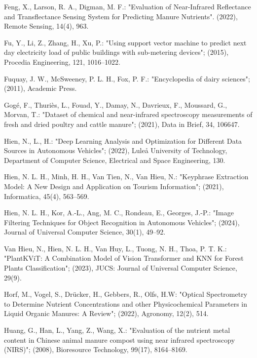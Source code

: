 \documentclass[10pt, a4paper, oneside]{article}
\begin{document}
\begin{thebibliography}{}
{ Feng, X., Larson, R. A., Digman, M. F.: "Evaluation of Near-Infrared Reflectance and Transflectance Sensing System for Predicting Manure Nutrients". (2022), Remote Sensing, 14(4), 963.

 Fu, Y., Li, Z., Zhang, H., Xu, P.: "Using support vector machine to predict next day electricity load of public buildings with sub-metering devices"; (2015), Procedia Engineering, 121, 1016–1022.

 Fuquay, J. W., McSweeney, P. L. H., Fox, P. F.: "Encyclopedia of dairy sciences"; (2011), Academic Press.

 Gogé, F., Thuriès, L., Fouad, Y., Damay, N., Davrieux, F., Moussard, G., Morvan, T.: "Dataset of chemical and near-infrared spectroscopy measurements of fresh and dried poultry and cattle manure"; (2021), Data in Brief, 34, 106647.

 Hien, N., L., H.: "Deep Learning Analysis and Optimization for Different Data Sources in Autonomous Vehicles"; (2022), Luleå University of Technology, Department of Computer Science, Electrical and Space Engineering, 130.

 Hien, N. L. H., Minh, H. H., Van Tien, N., Van Hieu, N.: "Keyphrase Extraction Model: A New Design and Application on Tourism Information"; (2021), Informatica, 45(4), 563–569.

 Hien, N. L. H., Kor, A.-L., Ang, M. C., Rondeau, E., Georges, J.-P.: "Image Filtering Techniques for Object Recognition in Autonomous Vehicles"; (2024), Journal of Universal Computer Science, 30(1), 49–92.

Van Hieu, N., Hien, N. L. H., Van Huy, L., Tuong, N. H., Thoa, P. T. K.: "PlantKViT: A Combination Model of Vision Transformer and KNN for Forest Plants Classification"; (2023), JUCS: Journal of Universal Computer Science, 29(9).

 Horf, M., Vogel, S., Drücker, H., Gebbers, R., Olfs, H.W: "Optical Spectrometry to Determine Nutrient Concentrations and other Physicochemical Parameters in Liquid Organic Manures: A Review"; (2022), Agronomy, 12(2), 514.

 Huang, G., Han, L., Yang, Z., Wang, X.: "Evaluation of the nutrient metal content in Chinese animal manure compost using near infrared spectroscopy (NIRS)"; (2008), Bioresource Technology, 99(17), 8164–8169.

}
\end{thebibliography}
\end{document}
